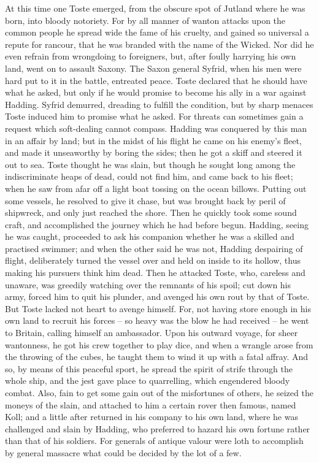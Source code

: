 \documentclass[10pt,a4paper]{report}
\begin{document}
At this time one Toste emerged, from the obscure spot of Jutland where he was born, into bloody notoriety. For by all manner of wanton attacks upon the common people he spread wide the fame of his cruelty, and gained so universal a repute for rancour, that he was branded with the name of the Wicked. Nor did he even refrain from wrongdoing to foreigners, but, after foully harrying his own land, went on to assault Saxony. The Saxon general Syfrid, when his men were hard put to it in the battle, entreated peace. Toste declared that he should have what he asked, but only if he would promise to become his ally in a war against Hadding. Syfrid demurred, dreading to fulfill the condition, but by sharp menaces Toste induced him to promise what he asked. For threats can sometimes gain a request which soft-dealing cannot compass. Hadding was conquered by this man in an affair by land; but in the midst of his flight he came on his enemy's fleet, and made it unseaworthy by boring the sides; then he got a skiff and steered it out to sea. Toste thought he was slain, but though he sought long among the indiscriminate heaps of dead, could not find him, and came back to his fleet; when he saw from afar off a light boat tossing on the ocean billows. Putting out some vessels, he resolved to give it chase, but was brought back by peril of shipwreck, and only just reached the shore. Then he quickly took some sound craft, and accomplished the journey which he had before begun. Hadding, seeing he was caught, proceeded to ask his companion whether he was a skilled and practised swimmer; and when the other said he was not, Hadding despairing of flight, deliberately turned the vessel over and held on inside to its hollow, thus making his pursuers think him dead. Then he attacked Toste, who, careless and unaware, was greedily watching over the remnants of his spoil; cut down his army, forced him to quit his plunder, and avenged his own rout by that of Toste.\\

But Toste lacked not heart to avenge himself. For, not having store enough in his own land to recruit his forces -- so heavy was the blow he had received -- he went to Britain, calling himself an ambassador. Upon his outward voyage, for sheer wantonness, he got his crew together to play dice, and when a wrangle arose from the throwing of the cubes, he taught them to wind it up with a fatal affray. And so, by means of this peaceful sport, he spread the spirit of strife through the whole ship, and the jest gave place to quarrelling, which engendered bloody combat. Also, fain to get some gain out of the misfortunes of others, he seized the moneys of the slain, and attached to him a certain rover then famous, named Koll; and a little after returned in his company to his own land, where he was challenged and slain by Hadding, who preferred to hazard his own fortune rather than that of his soldiers. For generals of antique valour were loth to accomplish by general massacre what could be decided by the lot of a few.\\
\end{document}

